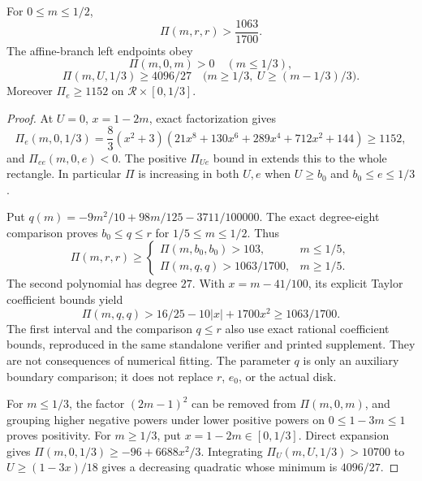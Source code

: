 \begin{lemma}
\label{lem:f-boundary-comparisons}
For $0\le m\le1/2$,
\[
 \Pi(m,r,r)>\frac{1063}{1700}.
\]
The affine-branch left endpoints obey
\[
 \Pi(m,0,m)>0\quad(m\le1/3),
\]
\[
 \Pi(m,U,1/3)\ge4096/27
 \quad\bigl(m\ge1/3,\ U\ge(m-1/3)/3\bigr).
\]
Moreover $\Pi_e\ge1152$ on $\mathcal R\times[0,1/3]$.
\end{lemma}
\begin{proof}
At $U=0$, $x=1-2m$, exact factorization gives
\[
 \Pi_e(m,0,1/3)=\frac83(x^2+3)
 (21x^8+130x^6+289x^4+712x^2+144)\ge1152,
\]
and $\Pi_{ee}(m,0,e)<0$.  The positive $\Pi_{Ue}$ bound in
 extends this to the whole
rectangle.  In particular $\Pi$ is increasing in both $U,e$ when
$U\ge b_0$ and $b_0\le e\le1/3$.

Put $q(m)=-9m^2/10+98m/125-3711/100000$.
The exact degree-eight comparison proves $b_0\le q\le r$ for
$1/5\le m\le1/2$.  Thus
\[
 \Pi(m,r,r)\ge
 \begin{cases}
 \Pi(m,b_0,b_0)>103,&m\le1/5,\\
 \Pi(m,q,q)>1063/1700,&m\ge1/5.
 \end{cases}
\]
The second polynomial has degree $27$.  With $x=m-41/100$, its explicit
Taylor coefficient bounds yield
\[
 \Pi(m,q,q)>16/25-10|x|+1700x^2\ge1063/1700.
\]
The first interval and the comparison $q\le r$ also use exact rational
coefficient bounds, reproduced in the same standalone verifier and
printed supplement.  They are not consequences of numerical fitting.
The parameter $q$ is only an auxiliary boundary comparison; it does not
replace $r$, $e_0$, or the actual disk.

For $m\le1/3$, the factor $(2m-1)^2$ can be removed from
$\Pi(m,0,m)$, and grouping higher negative powers under lower positive
powers on $0\le1-3m\le1$ proves positivity.
For $m\ge1/3$, put $x=1-2m\in[0,1/3]$.  Direct expansion gives
$\Pi(m,0,1/3)\ge-96+6688x^2/3$.  Integrating
$\Pi_U(m,U,1/3)>10700$ to $U\ge(1-3x)/18$ gives a decreasing
quadratic whose minimum is $4096/27$.
\end{proof}

